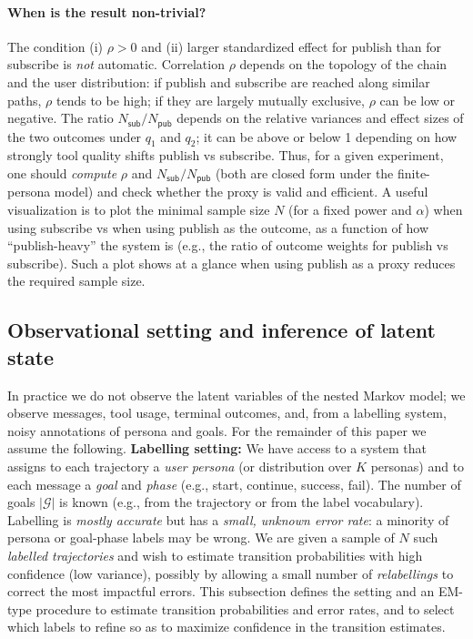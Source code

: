 \paragraph{When is the result non-trivial?}
The condition (i) $\rho > 0$ and (ii) larger standardized effect for publish than for subscribe is \emph{not} automatic. Correlation $\rho$ depends on the topology of the chain and the user distribution: if publish and subscribe are reached along similar paths, $\rho$ tends to be high; if they are largely mutually exclusive, $\rho$ can be low or negative. The ratio $N_{\mathsf{sub}}/N_{\mathsf{pub}}$ depends on the relative variances and effect sizes of the two outcomes under $q_1$ and $q_2$; it can be above or below 1 depending on how strongly tool quality shifts publish vs subscribe. Thus, for a given experiment, one should \emph{compute} $\rho$ and $N_{\mathsf{sub}}/N_{\mathsf{pub}}$ (both are closed form under the finite-persona model) and check whether the proxy is valid and efficient. A useful visualization is to plot the minimal sample size $N$ (for a fixed power and $\alpha$) when using subscribe vs when using publish as the outcome, as a function of how ``publish-heavy'' the system is (e.g., the ratio of outcome weights for publish vs subscribe). Such a plot shows at a glance when using publish as a proxy reduces the required sample size.

\subsection{Observational setting and inference of latent state}
\label{sec:method:inference}

In practice we do not observe the latent variables of the nested Markov model; we observe messages, tool usage, terminal outcomes, and, from a labelling system, noisy annotations of persona and goals. For the remainder of this paper we assume the following. \textbf{Labelling setting:} We have access to a system that assigns to each trajectory a \emph{user persona} (or distribution over $K$ personas) and to each message a \emph{goal} and \emph{phase} (e.g., start, continue, success, fail). The number of goals $|\mathcal{G}|$ is known (e.g., from the trajectory or from the label vocabulary). Labelling is \emph{mostly accurate} but has a \emph{small, unknown error rate}: a minority of persona or goal-phase labels may be wrong. We are given a sample of $N$ such \emph{labelled trajectories} and wish to estimate transition probabilities with high confidence (low variance), possibly by allowing a small number of \emph{relabellings} to correct the most impactful errors. This subsection defines the setting and an EM-type procedure to estimate transition probabilities and error rates, and to select which labels to refine so as to maximize confidence in the transition estimates.

